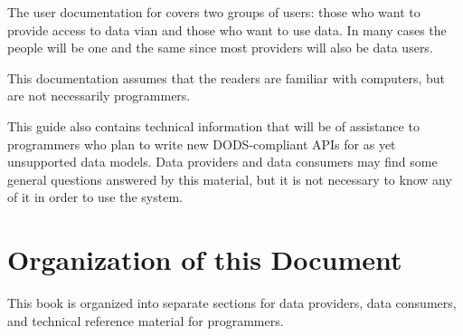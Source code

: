 The user documentation for \opendap covers two groups of users: those who
want to provide access to data vian \opendap and those who want to use
data. In many cases the people will be one and the same since most
providers will also be data users.

This documentation assumes that the readers are familiar with
computers, but are not necessarily programmers. 

This guide also contains technical information that will be of
assistance to programmers who plan to write new DODS-compliant APIs
for as yet unsupported data models. Data providers and data consumers
may find some general questions answered by this material, but it is
not necessary to know any of it in order to use the system.


\section{Organization of this Document}

This book is organized into separate sections for data providers, data
consumers, and technical reference material for programmers.

